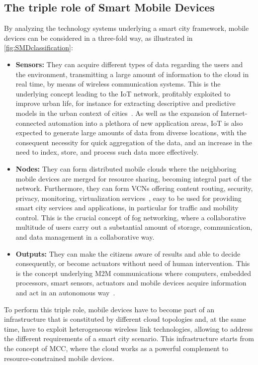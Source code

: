 \documentclass[twoside,openright]{report}
\begin{document}
\subsection*{The triple role of Smart Mobile Devices}
By analyzing the technology systems underlying a smart city framework, mobile devices can be considered in a three-fold way, as illustrated in \autoref{fig:SMDclassification}:
\begin{itemize}
\item \textbf{Sensors:} They can acquire different types of data regarding the users and the environment, transmitting a large amount of information to the cloud in real time, by means of wireless communication systems. 
This is the underlying concept leading to the \gls{IoT} network, profitably exploited to improve urban life, for instance for extracting descriptive and predictive models in the urban context of cities~\cite{IoTCC}. As well as the expansion of Internet-connected automation into a plethora of new application areas, \gls{IoT} is also expected to generate large amounts of data from diverse locations, with the consequent necessity for quick aggregation of the data, and an increase in the need to index, store, and process such data more effectively. 
\item \textbf{Nodes:} They can form distributed mobile clouds where the neighboring mobile devices are merged for resource sharing, becoming integral part of the network. 
Furthermore, they can form \glspl{VCN} offering content routing, security, privacy, monitoring, virtualization services~\cite{Gerla}, easy to be used for providing smart city services and applications, in particular for traffic and mobility control. 
This is the crucial concept of fog networking, where a collaborative multitude of users carry out a substantial amount of storage, communication, and data management in a collaborative way.
\item \textbf{Outputs:} They can make the citizens aware of results and able to decide consequently, or become actuators without need of human intervention. This is the concept underlying \gls{M2M} communications where computers, embedded processors, smart sensors, actuators and mobile devices acquire information and act in an autonomous way~\cite{M2M}.
\end{itemize}
To perform this triple role, mobile devices have to become part of an infrastructure that is constituted by different cloud topologies and, at the same time, have to exploit heterogeneous wireless link technologies, allowing to address the different requirements of a smart city scenario. This infrastructure starts from the concept of \gls{MCC}, where the cloud works as a powerful complement to resource-constrained mobile devices.
\end{document}
